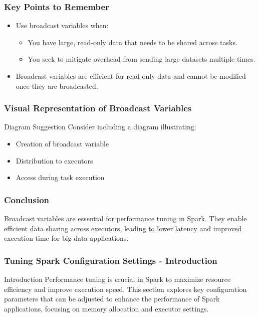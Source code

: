 \documentclass[aspectratio=169]{beamer}
\begin{document}
\begin{frame}[fragile]
    \frametitle{Key Points to Remember}
    \begin{itemize}
        \item Use broadcast variables when:
        \begin{itemize}
            \item You have large, read-only data that needs to be shared across tasks.
            \item You seek to mitigate overhead from sending large datasets multiple times.
        \end{itemize}
        \item Broadcast variables are efficient for read-only data and cannot be modified once they are broadcasted.
    \end{itemize}
\end{frame}

\begin{frame}[fragile]
    \frametitle{Visual Representation of Broadcast Variables}
    \begin{block}{Diagram Suggestion}
        Consider including a diagram illustrating:
        \begin{itemize}
            \item Creation of broadcast variable
            \item Distribution to executors
            \item Access during task execution
        \end{itemize}
    \end{block}
\end{frame}

\begin{frame}[fragile]
    \frametitle{Conclusion}
    Broadcast variables are essential for performance tuning in Spark. They enable efficient data sharing across executors, leading to lower latency and improved execution time for big data applications.
\end{frame}

\begin{frame}[fragile]
    \frametitle{Tuning Spark Configuration Settings - Introduction}
    \begin{block}{Introduction}
        Performance tuning is crucial in Spark to maximize resource efficiency and improve execution speed. 
        This section explores key configuration parameters that can be adjusted to enhance the performance of Spark applications, focusing on memory allocation and executor settings.
    \end{block}
\end{frame}
\end{document}

